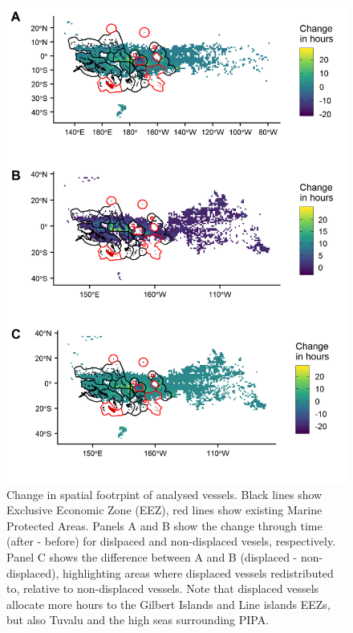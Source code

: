 \documentclass[9p,twocolumn,twoside,lineno]{pnas-new}
\begin{document}
\begin{figure}[H]
\centering
\includegraphics{img/fishing_raster_diff.png}
\caption{\label{fig:fishing_raster_diff}Change in spatial footrpint of analysed vessels. Black lines show Exclusive Economic Zone (EEZ), red lines show existing Marine Protected Areas. Panels A and B show the change through time (after - before) for dislpaced and non-displaced vesels, respectively. Panel C shows the difference between A and B (displaced - non-displaced), highlighting areas where displaced vessels redistributed to, relative to non-displaced vessels. Note that displaced vessels allocate more hours to the Gilbert Islands and Line islands EEZs, but also Tuvalu and the high seas surrounding PIPA.}
\end{figure}
\end{document}
